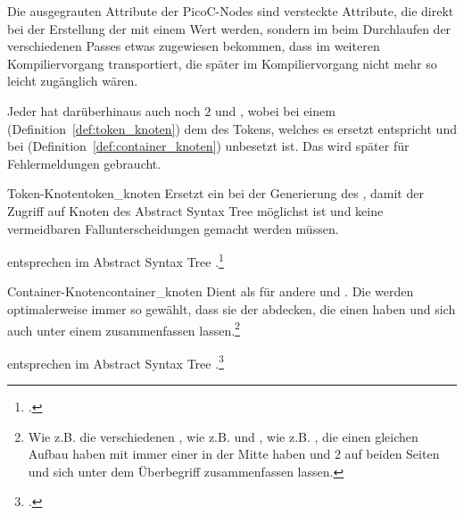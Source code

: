 \begin{Special_Paragraph}
  Die \textcolor{gray!90!black}{ausgegrauten} Attribute der PicoC-Nodes sind \textcolor{gray!90!black}{versteckte Attribute}, die  direkt bei der Erstellung der   mit einem Wert  werden, sondern im  beim Durchlaufen der verschiedenen Passes etwas zugewiesen bekommen, dass im weiteren Kompiliervorgang  transportiert, die später im Kompiliervorgang nicht mehr so leicht zugänglich wären.

  Jeder  hat darüberhinaus auch noch $2$   und , wobei  bei einem  (Definition~\ref{def:token_knoten}) dem  des Tokens, welches es ersetzt entspricht und bei  (Definition~\ref{def:container_knoten}) unbesetzt ist. Das   wird später für Fehlermeldungen gebraucht.
\end{Special_Paragraph}

\begin{Definition}{Token-Knoten}{token_knoten}
  Ersetzt ein  bei der Generierung des , damit der Zugriff auf Knoten des Abstract Syntax Tree möglichst  ist und keine vermeidbaren Fallunterscheidungen gemacht werden müssen.

   entsprechen im Abstract Syntax Tree .\footcite{thiemann_compilerbau_2021}
\end{Definition}

\begin{Definition}{Container-Knoten}{container_knoten}
  Dient als  für andere  und . Die  werden optimalerweise immer so gewählt, dass sie  der  abdecken, die einen  haben und sich auch unter einem  zusammenfassen lassen.\footnote{Wie z.B. die verschiedenen , wie z.B.  und , wie z.B. , die einen gleichen Aufbau haben mit immer einer  in der Mitte haben und $2$  auf beiden Seiten und sich unter dem Überbegriff  zusammenfassen lassen.}

   entsprechen im Abstract Syntax Tree .\footcite{thiemann_compilerbau_2021}
\end{Definition}

